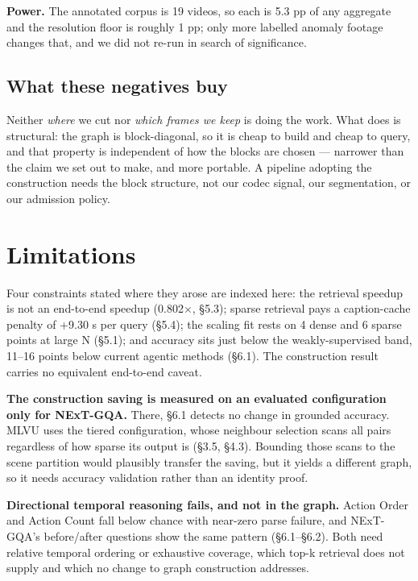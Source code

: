 \documentclass[sigconf,review,anonymous]{acmart}
\begin{document}
\textbf{Power.} The annotated corpus is 19 videos, so each is 5.3 pp of any aggregate and the
resolution floor is roughly 1 pp; only more labelled anomaly footage changes that, and we did
not re-run in search of significance.

\subsection{What these negatives buy}

Neither \emph{where} we cut nor \emph{which frames we keep} is doing the work. What does is structural:
the graph is block-diagonal, so it is cheap to build and cheap to query, and that property is
independent of how the blocks are chosen --- narrower than the claim we set out to make, and
more portable. A pipeline adopting the construction needs the block structure, not our codec
signal, our segmentation, or our admission policy.

\section{Limitations}

Four constraints stated where they arose are indexed here: the retrieval speedup is
not an end-to-end speedup (0.802\ensuremath{\times}, §5.3); sparse retrieval pays a caption-cache penalty of
+9.30 s per query (§5.4); the scaling fit rests on 4 dense and 6 sparse points at large N
(§5.1); and accuracy sits just below the weakly-supervised band, 11--16 points below current
agentic methods (§6.1). The construction result carries no equivalent end-to-end caveat.

\textbf{The construction saving is measured on an evaluated configuration only for NExT-GQA.}
There, §6.1 detects no change in grounded accuracy. MLVU uses the tiered configuration, whose
neighbour selection scans all pairs regardless of how sparse its output is (§3.5, §4.3).
Bounding those scans to the scene partition would plausibly transfer the saving, but it yields
a different graph, so it needs accuracy validation rather than an identity proof.

\textbf{Directional temporal reasoning fails, and not in the graph.} Action Order and Action Count
fall below chance with near-zero parse failure, and NExT-GQA's before/after questions show the
same pattern (§6.1--§6.2). Both need relative temporal ordering or exhaustive coverage, which top-k
retrieval does not supply and which no change to graph construction addresses.
\end{document}

